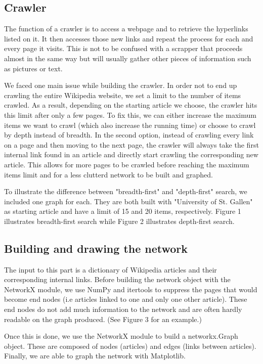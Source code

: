 \documentclass[10pt]{article}
\begin{document}
	\subsection{Crawler}
	The function of a crawler is to access a webpage and to retrieve the hyperlinks listed on it. It then accesses those new links and repeat the process for each and every page it visits. This is not to be confused with a scrapper that proceeds almost in the same way but will usually gather other pieces of information such as pictures or text.
\par \noindent
We faced one main issue while building the crawler. In order not to end up crawling the entire Wikipedia website, we set a limit to the number of items crawled. As a result, depending on the starting article we choose, the crawler hits this limit after only a few pages. To fix this, we can either increase the maximum items we want to crawl (which also increase the running time) or choose to crawl by depth instead of breadth. In the second option, instead of crawling every link on a page and then moving to the next page, the crawler will always take the first internal link found in an article and directly start crawling the corresponding new article. This allows for more pages to be crawled before reaching the maximum items limit and for a less clutterd network to be built and graphed.
\par \noindent
To illustrate the difference between "breadth-first" and "depth-first" search, we included one graph for each. They are both built with "University of St. Gallen" as starting article and have a limit of 15 and 20 items, respectively. Figure 1 illustrates breadth-first search while Figure 2 illustrates depth-first search.

	
	\subsection{Building and drawing the network}
	The input to this part is a dictionary of Wikipedia articles and their corresponding internal links. Before building the network object with the NetworkX module, we use NumPy and itertools to suppress the pages that would become end nodes (i.e articles linked to one and only one other article). These end nodes do not add much information to the network and are often hardly readable on the graph produced. (See Figure 3 for an example.)
\par \noindent
Once this is done, we use the NetworkX module to build a networkx.Graph object. These are composed of nodes (articles) and edges (links between articles). Finally, we are able to graph the network with Matplotlib.
\par \noindent
\end{document}
